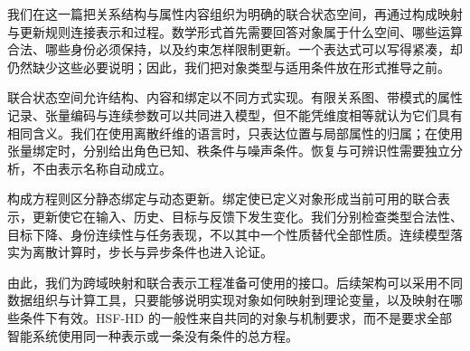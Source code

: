 \label{part:mathematical-formalism}

我们在这一篇把关系结构与属性内容组织为明确的联合状态空间，再通过构成映射与更新规则连接表示和过程。数学形式首先需要回答对象属于什么空间、哪些运算合法、哪些身份必须保持，以及约束怎样限制更新。一个表达式可以写得紧凑，却仍然缺少这些必要说明；因此，我们把对象类型与适用条件放在形式推导之前。

联合状态空间允许结构、内容和绑定以不同方式实现。有限关系图、带模式的属性记录、张量编码与连续参数可以共同进入模型，但不能凭维度相等就认为它们具有相同含义。我们在使用离散纤维的语言时，只表达位置与局部属性的归属；在使用张量绑定时，分别给出角色已知、秩条件与噪声条件。恢复与可辨识性需要独立分析，不由表示名称自动成立。

构成方程则区分静态绑定与动态更新。绑定使已定义对象形成当前可用的联合表示，更新使它在输入、历史、目标与反馈下发生变化。我们分别检查类型合法性、目标下降、身份连续性与任务表现，不以其中一个性质替代全部性质。连续模型落实为离散计算时，步长与异步条件也进入论证。

由此，我们为跨域映射和联合表示工程准备可使用的接口。后续架构可以采用不同数据组织与计算工具，只要能够说明实现对象如何映射到理论变量，以及映射在哪些条件下有效。HSF-HD 的一般性来自共同的对象与机制要求，而不是要求全部智能系统使用同一种表示或一条没有条件的总方程。
